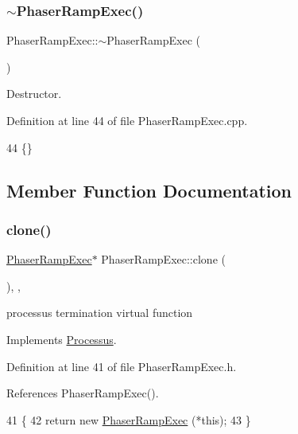\subsubsection{\texorpdfstring{$\sim$\+Phaser\+Ramp\+Exec()}{~PhaserRampExec()}}
{\footnotesize\ttfamily Phaser\+Ramp\+Exec\+::$\sim$\+Phaser\+Ramp\+Exec (\begin{DoxyParamCaption}{ }\end{DoxyParamCaption})\hspace{0.3cm}{\ttfamily [virtual]}}



Destructor. 



Definition at line 44 of file Phaser\+Ramp\+Exec.\+cpp.


\begin{DoxyCode}
44 \{\}
\end{DoxyCode}


\subsection{Member Function Documentation}
\mbox{\label{classPhaserRampExec_a2586b2209d381c5b82a13dc2f997925f}} 
\subsubsection{\texorpdfstring{clone()}{clone()}}
{\footnotesize\ttfamily \hyperlink{classPhaserRampExec}{Phaser\+Ramp\+Exec}$\ast$ Phaser\+Ramp\+Exec\+::clone (\begin{DoxyParamCaption}{ }\end{DoxyParamCaption})\hspace{0.3cm}{\ttfamily [inline]}, {\ttfamily [protected]}, {\ttfamily [virtual]}}

processus termination virtual function 

Implements \hyperlink{classProcessus_aca8856f6d6d7b7e1fe941f298dcbb502}{Processus}.



Definition at line 41 of file Phaser\+Ramp\+Exec.\+h.



References Phaser\+Ramp\+Exec().


\begin{DoxyCode}
41                          \{
42     \textcolor{keywordflow}{return} \textcolor{keyword}{new} \hyperlink{classPhaserRampExec_a26f14f1c66dd37251374998ae0a4f02a}{PhaserRampExec} (*\textcolor{keyword}{this});
43   \}
\end{DoxyCode}
\mbox{\label{classPhaserRampExec_a5fccbd3cddf738318f9d45d64b723907}} 
